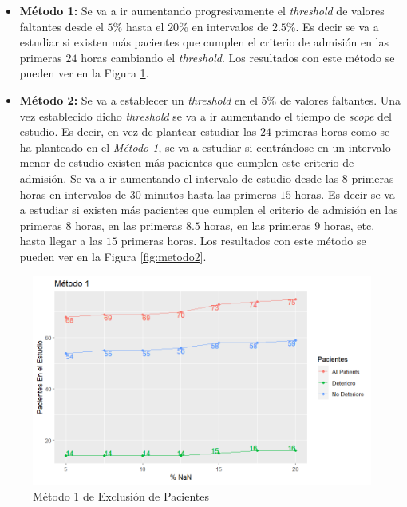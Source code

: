 \begin{itemize}
    \item \textbf{Método 1:} Se va a ir aumentando progresivamente el \textit{threshold} de valores faltantes desde el $5 \%$ hasta el $20 \%$ en intervalos de $2.5 \%$.  Es decir se va a estudiar si existen más pacientes que cumplen el criterio de admisión en las primeras $24$ horas cambiando el \textit{threshold}. Los resultados con este método se pueden ver en la Figura \ref{fig:metodo1}.
    \item \textbf{Método 2:} Se va a establecer un \textit{threshold} en el $5 \%$ de valores faltantes. Una vez establecido dicho \textit{threshold} se va a ir aumentando el tiempo de \textit{scope} del estudio. Es decir, en vez de plantear estudiar las $24$ primeras horas como se ha planteado en el \textit{Método 1}, se va a estudiar si centrándose en un intervalo menor de estudio existen más pacientes que cumplen este criterio de admisión. Se va a ir aumentando el intervalo de estudio desde las $8$ primeras horas en intervalos de $30$ minutos hasta las primeras $15$ horas. Es decir se va a estudiar si existen más pacientes que cumplen el criterio de admisión en las primeras $8$ horas, en las primeras $8.5$ horas, en las primeras $9$ horas, etc. hasta llegar a las $15$ primeras horas.  Los resultados con este método se pueden ver en la Figura \ref{fig:metodo2}.
\end{itemize}

\begin{figure}[H]
    \centering
    \includegraphics[scale = 1]{./img/metodo1.png}
    \caption{Método 1 de Exclusión de Pacientes}
    \label{fig:metodo1}
\end{figure}

